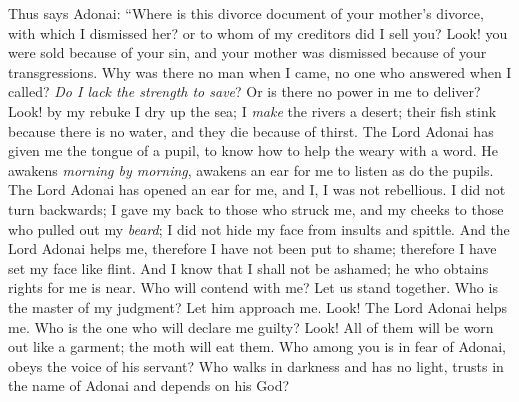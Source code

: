 \begin{biblechapter} %
\verse Thus says Adonai:
\verse “Where is this divorce document of your mother’s divorce, with which I dismissed her? 
or to whom of my creditors did I sell you? 
Look! you were sold because of your sin, 
and your mother was dismissed because of your transgressions.
\verse Why was there no man when I came, 
no one who answered when I called? 
\textit{Do I lack the strength to save}? 
Or is there no power in me to deliver? 
Look! by my rebuke I dry up the sea; 
I \textit{make} the rivers a desert; 
their fish stink because there is no water, 
and they die because of thirst.
 The Lord Adonai has given me the tongue of a pupil, 
to know how to help the weary with a word. 
He awakens \textit{morning by morning}, 
awakens an ear for me to listen as do the pupils.
\verse The Lord Adonai has opened an ear for me, 
and I, I was not rebellious. 
I did not turn backwards;
\verse I gave my back to those who struck me, 
and my cheeks to those who pulled out my \textit{beard}; 
I did not hide my face from insults and spittle.
\verse And the Lord Adonai helps me,
\verse therefore I have not been put to shame; 
therefore I have set my face like flint. 
And I know that I shall not be ashamed;
\verse he who obtains rights for me is near. 
Who will contend with me? Let us stand together. 
Who is the master of my judgment? Let him approach me.
\verse Look! The Lord Adonai helps me. 
Who is the one who will declare me guilty? 
Look! All of them will be worn out like a garment; 
the moth will eat them.
\verse Who among you is in fear of Adonai, 
obeys the voice of his servant? 
Who walks in darkness 
and has no light, 
trusts in the name of Adonai 
and depends on his God?
\end{biblechapter}

